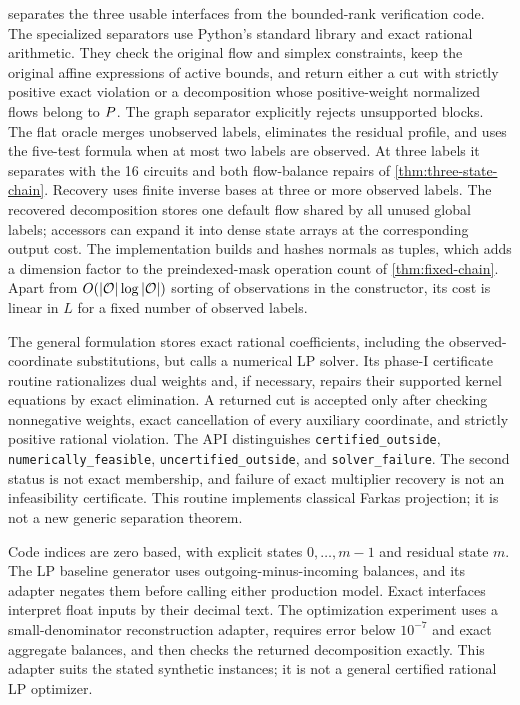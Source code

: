  separates the three usable interfaces from
the bounded-rank verification code. The specialized separators use
Python's standard library and exact rational arithmetic. They check the
original flow and simplex constraints, keep the original affine expressions
of active bounds, and return either a cut with strictly positive exact
violation or a decomposition whose positive-weight normalized flows belong
to $P$. The graph separator explicitly rejects unsupported blocks. The
flat oracle merges unobserved labels, eliminates the residual profile, and
uses the five-test formula when at most two labels are observed. At three
labels it separates with the 16 circuits and both flow-balance repairs of
\cref{thm:three-state-chain}. Recovery uses finite inverse bases at three
or more observed labels. The recovered decomposition stores one default
flow shared by all unused global labels; accessors can expand it into
dense state arrays at the corresponding output cost. The implementation
builds and hashes normals as tuples, which adds a dimension factor to the
preindexed-mask operation count of \cref{thm:fixed-chain}. Apart from
$O(|\mathcal O|\log|\mathcal O|)$ sorting of observations in the constructor, its cost
is linear in $L$ for a fixed number of observed labels.

The general formulation stores exact rational coefficients, including the
observed-coordinate substitutions, but calls a numerical LP solver.
Its phase-I certificate routine rationalizes dual weights and, if necessary,
repairs their supported kernel equations by exact elimination. A returned
cut is accepted only after checking nonnegative weights, exact cancellation
of every auxiliary coordinate, and strictly positive rational violation.
The API distinguishes \texttt{certified\_outside},
\texttt{numerically\_feasible}, \texttt{uncertified\_outside}, and
\texttt{solver\_failure}. The second status is not exact membership,
and failure of exact multiplier recovery is not an infeasibility certificate.
This routine implements classical Farkas projection; it is not a new
generic separation theorem.

Code indices are zero based, with explicit states $0,\ldots,m-1$ and
residual state $m$. The LP baseline generator uses outgoing-minus-incoming
balances, and its adapter negates them before calling either production
model. Exact interfaces interpret float inputs by their decimal text. The
optimization experiment uses a small-denominator reconstruction adapter,
requires error below $10^{-7}$ and exact aggregate balances, and then
checks the returned decomposition exactly. This adapter suits the stated
synthetic instances; it is not a general certified rational LP optimizer.

